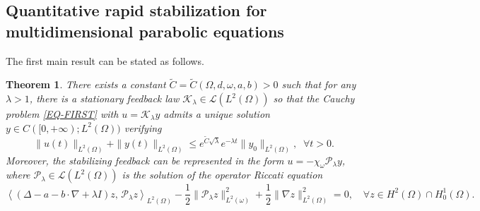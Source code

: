 \documentclass[a4paper]{article}
\newtheorem{theorem}{Theorem}[section]
\numberwithin{equation}{section}
\begin{document}
\subsection{Quantitative rapid stabilization for multidimensional parabolic equations}\label{subsec1.2}

The first main result can be stated as follows.
\begin{theorem}\label{main-th-rapid-stab}
There exists a constant $\tilde{C}=\tilde{C}\left(\Omega,d,\omega,a,b\right)>0$ such that for any $\lambda>1$, there is a stationary feedback law $\mathcal{K}_{\lambda}\in\mathcal{L}(L^2(\Omega))$ so that the Cauchy problem \eqref{EQ-FIRST} with $u=\mathcal{K}_{\lambda}y$ admits a unique solution $y\in C([0,+\infty); L^2(\Omega))$ verifying
\begin{equation}\label{y-decay}
\|u(t)\|_{L^2(\Omega)}+\|y(t)\|_{L^2(\Omega)}\le e^{\tilde{C}\sqrt{\lambda}}e^{-{\lambda}t}\|y_0\|_{  L^2(\Omega)},\;\; \forall t>0.
\end{equation}
Moreover, the stabilizing feedback can be represented in the form $u=-\chi_\omega \mathcal P_\lambda y$, where $\mathcal P_\lambda\in\mathcal{L}(L^2(\Omega))$ is the solution of the operator Riccati equation 
\begin{equation}\label{PLAMBDA-61-RICCATI}
\left\langle (\Delta - a - b\cdot \nabla+\lambda I) {z},\, \mathcal P_\lambda  {z} \right\rangle_{L^2(\Omega)}-\frac12 \|\mathcal P_\lambda  {z}\|_{L^2(\omega)}^2+\frac12 \|\nabla  {z}\|_{L^2(\Omega)}^2=0,\quad \forall  {z}\in H^2(\Omega)\cap H_0^1(\Omega).\end{equation}
\end{theorem}
\end{document}
